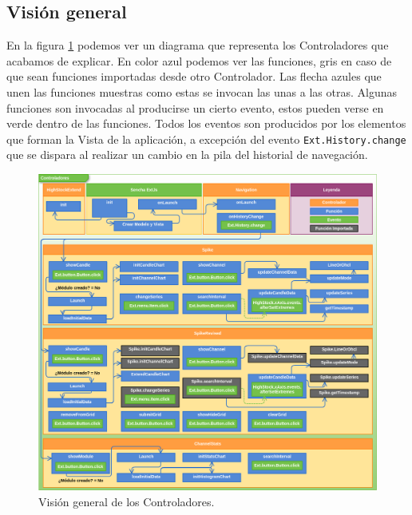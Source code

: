 	\subsection{Visión general}
		En la figura \ref{fig:controllers} podemos ver un diagrama que representa los Controladores que acabamos de explicar. En color azul
		podemos ver las funciones, gris en caso de que sean funciones importadas desde otro Controlador. Las flecha azules que unen las
		funciones muestras como estas se invocan las unas a las otras. Algunas funciones son invocadas al producirse un cierto evento, estos
		pueden verse en verde dentro de las funciones. Todos los eventos son producidos por los elementos que forman la Vista de la
		aplicación, a excepción del evento \texttt{Ext.History.change} que se dispara al realizar un cambio en la pila del historial de
		navegación.
		\begin{figure}[h]
			\centering
			\includegraphics[keepaspectratio, width=1\textwidth]{./img/controllers.png}
			\caption{Visión general de los Controladores.}   
			\label{fig:controllers}
		\end{figure}
